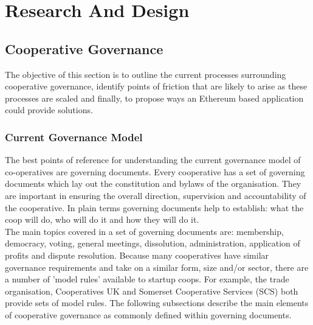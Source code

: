 
\chapter{Research And Design} %

\label{ResearchAndDesign} %

\section{Cooperative Governance}
\label{subsec:CooperativeGovernance}
The objective of this section is to outline the current processes surrounding cooperative governance, identify points of friction that are likely to arise as these processes are scaled and finally, to propose ways an Ethereum based application could provide solutions.

\subsection{Current Governance Model}
The best points of reference for understanding the current governance model of co-operatives are governing documents. Every cooperative has a set of governing documents which lay out the constitution and bylaws of the organisation. They are important in ensuring the overall direction, supervision and accountability of the cooperative. In plain terms governing documents help to establish: what the coop will do, who will do it and how they will do it. \\

The main topics covered in a set of governing documents are: membership, democracy, voting, general meetings, dissolution, administration, application of profits and dispute resolution. Because many cooperatives have similar governance requirements and take on a similar form, size and/or sector, there are a number of 'model rules' available to startup coops. For example, the trade organisation, Cooperatives UK \cite{modelRules} and Somerset Cooperative Services\cite{somersetRules} (SCS) both provide sets of model rules. The following subsections describe the main elements of cooperative governance as commonly defined within governing documents.\\

